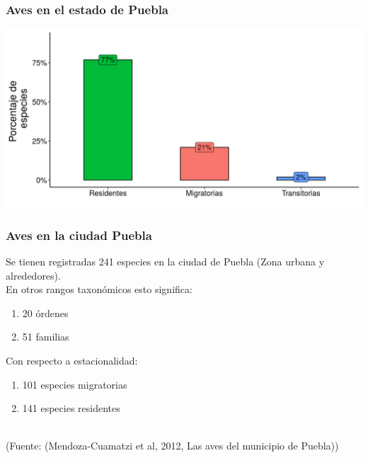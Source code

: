 \documentclass[compress]{beamer}
\begin{document}
{
  \begin{frame}
    \frametitle{Aves en el estado de  Puebla}
    \begin{center}
      \includegraphics[scale=0.5]{graficos/porcentajeAvesPuebla.png}\\
    \end{center}

 \end{frame}
}


{
  \begin{frame}
    \frametitle{Aves en la ciudad  Puebla}
    \begin{center}
      Se tienen registradas 241 especies en la ciudad de Puebla (Zona urbana y alrededores).\\
      En otros rangos taxonómicos esto significa:\\
      \begin{enumerate}
       \item 20 órdenes
       \item 51 familias
      \end{enumerate}
      Con respecto a estacionalidad: \\
      \begin{enumerate}
       \item 101 especies migratorias
       \item 141 especies residentes
      \end{enumerate}
      
    \end{center} \\[0.2cm]

     \tiny(Fuente: (Mendoza-Cuamatzi et al, 2012, Las aves del municipio de Puebla))


 \end{frame}
}
\end{document}
